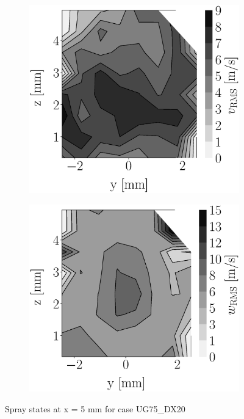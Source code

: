 \begin{figure}[h!]
\begin{subfigure}[b]{0.22\textwidth}
\end{subfigure}
   \hspace{0.17in}
\begin{subfigure}[b]{0.22\textwidth}
	\centering
   \includegraphics[scale=0.17]{./part2_developments/figures_ch5_resolved_JICF/injectors_SLI/uG75_dx20_x05_uy_rms_map.eps}
\end{subfigure}
   \hspace{0.17in}
\begin{subfigure}[b]{0.22\textwidth}
	\centering
   \includegraphics[scale=0.17]{./part2_developments/figures_ch5_resolved_JICF/injectors_SLI/uG75_dx20_x05_uz_rms_map.eps}
\end{subfigure}
\caption{Spray states at x = 5 mm for case UG75\_DX20}
\label{fig:injectors_sli_uG75_dx20_x05}
\end{figure}


